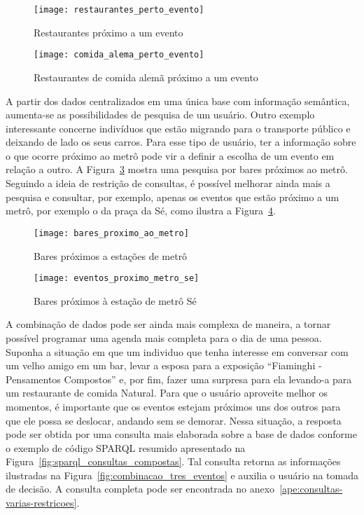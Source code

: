 \begin{figure}[!ht]
  \centering
  \texttt{[image: restaurantes\_perto\_evento]} 
  \caption{Restaurantes próximo a um evento}
  \label{fig:restaurantes_perto_evento} 
\end{figure}

\begin{figure}[!ht]
  \centering
  \texttt{[image: comida\_alema\_perto\_evento]} 
  \caption{Restaurantes de comida alemã próximo a um evento}
  \label{fig:comida_alema_perto_evento} 
\end{figure}

A partir dos dados centralizados em uma única base com informação semântica, aumenta-se as possibilidades de pesquisa de um usuário. Outro exemplo interessante concerne indivíduos que estão migrando para o transporte público e deixando de lado os seus carros. Para esse tipo de usuário, ter a informação sobre o que ocorre próximo ao metrô pode vir a definir a escolha de um evento em relação a outro. A Figura~\ref{fig:bares_proximo_ao_metro} mostra uma pesquisa por bares próximos ao metrô. Seguindo a ideia de restrição de consultas, é possível melhorar ainda mais a pesquisa e consultar, por exemplo, apenas os eventos que estão próximo a um metrô, por exemplo o da praça da Sé, como ilustra a Figura~\ref{fig:eventos_proximo_metro_se}.

\begin{figure}[!ht]
  \centering
  \texttt{[image: bares\_proximo\_ao\_metro]} 
  \caption{Bares próximos a estações de metrô}
  \label{fig:bares_proximo_ao_metro} 
\end{figure}

\begin{figure}[!ht]
  \centering
  \texttt{[image: eventos\_proximo\_metro\_se]} 
  \caption{Bares próximos à estação de metrô Sé}
  \label{fig:eventos_proximo_metro_se} 
\end{figure}

A combinação de dados pode ser ainda mais complexa de maneira, a tornar possível programar uma agenda mais completa para o dia de uma pessoa. Suponha a situação em que um individuo que tenha interesse em conversar com um velho amigo em um bar, levar a esposa para a exposição ``Fiaminghi - Pensamentos Compostos'' e, por fim, fazer uma surpresa para ela levando-a para um restaurante de comida Natural. Para que o usuário aproveite melhor os momentos, é importante que os eventos estejam próximos uns dos outros para que ele possa se deslocar, andando sem se demorar. Nessa situação, a resposta pode ser obtida por uma consulta mais elaborada sobre a base de dados conforme o exemplo de código SPARQL resumido apresentado na Figura~\ref{fig:sparql_consultas_compostas}. Tal consulta retorna as informações  ilustradas na Figura~\ref{fig:combinacao_tres_eventos} e auxilia o usuário na tomada de decisão. A consulta completa pode ser encontrada no anexo~\ref{ape:consultas-varias-restricoes}.

